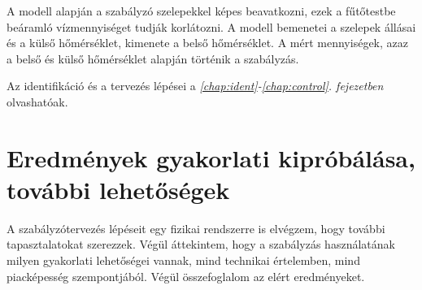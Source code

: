 A modell alapján a szabályzó szelepekkel képes beavatkozni, ezek a fűtőtestbe beáramló vízmennyiséget tudják korlátozni. A modell bemenetei a szelepek állásai és a külső hőmérséklet, kimenete a belső hőmérséklet.  A mért mennyiségek, azaz a belső és külső hőmérséklet alapján történik a szabályzás. 

Az identifikáció és a tervezés lépései a \textit{\ref{chap:ident}-\ref{chap:control}. fejezetben} olvashatóak.


%


\section*{Eredmények gyakorlati kipróbálása, további lehetőségek}

A szabályzótervezés lépéseit egy fizikai rendszerre is elvégzem, hogy további tapasztalatokat szerezzek. Végül áttekintem, hogy a szabályzás használatának milyen gyakorlati lehetőségei vannak, mind technikai értelemben, mind piacképesség szempontjából. Végül összefoglalom az elért eredményeket.












